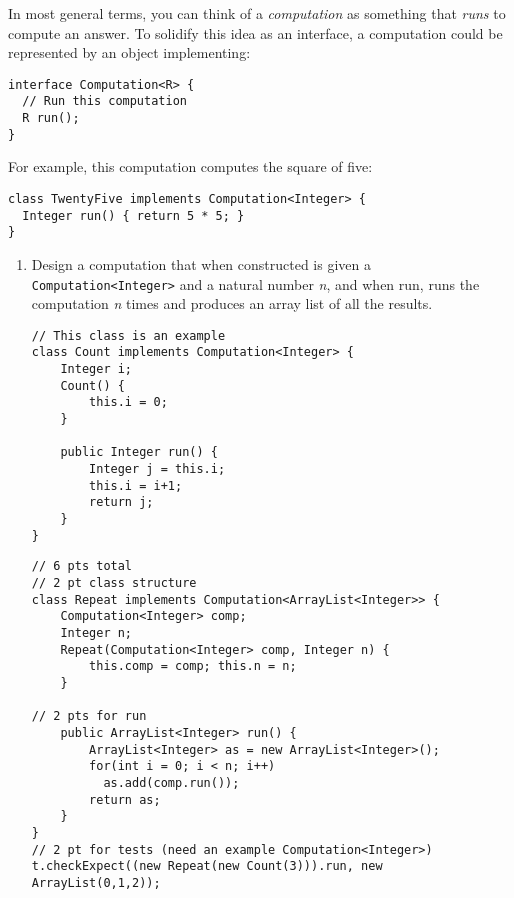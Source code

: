 \documentclass[12pt]{article}                   %
\def\pts#1{\marginpar{\footnotesize \raggedright  \fbox{#1 {\sc Points}}}}
\newenvironment{solution}{\color{Red}}{}
\begin{document}
\begin{problem} \pts{18}

In most general terms, you can think of a \emph{computation} as something that
\emph{runs} to compute an answer.  To solidify this idea as an interface, a
computation could be represented by an object implementing:

\begin{verbatim}
interface Computation<R> {
  // Run this computation
  R run();
}
\end{verbatim}

\noindent
For example, this computation computes the square of five:

\begin{verbatim}
class TwentyFive implements Computation<Integer> {
  Integer run() { return 5 * 5; }
}
\end{verbatim}

\begin{enumerate}

\item Design a computation that when constructed is given a
 \texttt{Computation<Integer>} and a natural number \emph{n}, and when
 run, runs the computation \emph{n} times and produces an array list
of all the results.

\begin{solution}
\begin{verbatim}
// This class is an example
class Count implements Computation<Integer> {
    Integer i;
    Count() {
        this.i = 0;
    }

    public Integer run() {
        Integer j = this.i;
        this.i = i+1;
        return j;
    }      
}
\end{verbatim}
\newpage
\begin{verbatim}
// 6 pts total
// 2 pt class structure
class Repeat implements Computation<ArrayList<Integer>> {
    Computation<Integer> comp;
    Integer n;
    Repeat(Computation<Integer> comp, Integer n) {
        this.comp = comp; this.n = n;
    }

// 2 pts for run
    public ArrayList<Integer> run() {
        ArrayList<Integer> as = new ArrayList<Integer>();
        for(int i = 0; i < n; i++) 
          as.add(comp.run());
        return as;
    }      
}
// 2 pt for tests (need an example Computation<Integer>)
t.checkExpect((new Repeat(new Count(3))).run, new ArrayList(0,1,2));
\end{verbatim}
\newpage
\end{solution}


\end{enumerate}
\end{problem}
\end{document}
